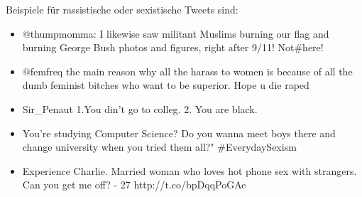 Beispiele f{\"u}r rassistische oder sexistische Tweets sind:
\begin{itemize}
  \item $@$thumpmomma: I likewise saw militant Muslims burning our flag and burning George Bush photos and figures, right after 9/11! Not\#here!
  \item $@$femfreq the main reason why all the harass to women is because of all the dumb feminist bitches who want to be superior. Hope u die raped
  \item Sir\_Penaut 1.You din't go to colleg. 2. You are black.
  \item You're studying Computer Science? Do you wanna meet boys there and change university when you tried them all?" \#EverydaySexism
  \item Experience Charlie. Married woman who loves hot phone sex with strangers. Can you get me off? - 27 http://t.co/bpDqqPoGAe
\end{itemize}
                                                                                                                                                                                                                                                                                                                                                                                                                                                                                                                                                                                                                                                                                                                                                                                                                                                                                                                                                                                                                                                                                                                                                                                                                                                                                                                                                                                                                                                                                                                                                                                                                                                                                                                                                                                                                                                                                                                                                                       
